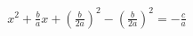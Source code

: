\documentclass[preview]{standalone}
\begin{document}
\begin{align*}
x^{2}+\frac{b}{a}x+ \left( \frac{b}{2a} \right)^{2} -\left( \frac{b}{2a} \right)^{2} = -\frac{c}{a}
\end{align*}
\end{document}
